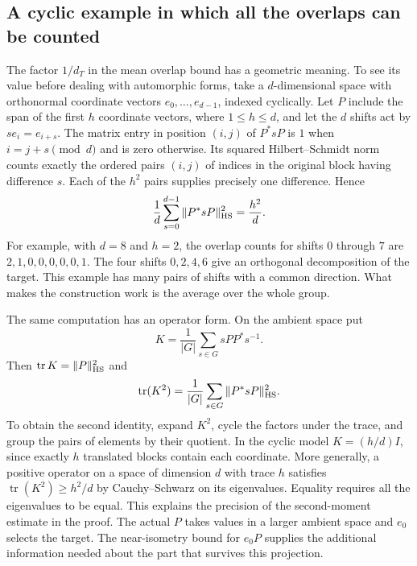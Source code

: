 \documentclass[11pt,letterpaper]{article}
\begin{document}
\subsection{A cyclic example in which all the overlaps can be counted}
\label{sec:cyclic-frame}
The factor $1/d_T$ in the mean overlap bound has a geometric meaning. To see its value before dealing with automorphic forms, take a $d$-dimensional space with orthonormal coordinate vectors $e_0,\ldots,e_{d-1}$, indexed cyclically. Let $P$ include the span of the first $h$ coordinate vectors, where $1\le h\le d$, and let the $d$ shifts act by $s e_i=e_{i+s}$. The matrix entry in position $(i,j)$ of $P^*sP$ is $1$ when $i=j+s\pmod d$ and is zero otherwise. Its squared Hilbert--Schmidt norm counts exactly the ordered pairs $(i,j)$ of indices in the original block having difference $s$. Each of the $h^2$ pairs supplies precisely one difference. Hence
\[
   \frac1d\sum_{s=0}^{d-1}\|P^*sP\|_{\rm HS}^2=\frac{h^2}{d}.
\]
For example, with $d=8$ and $h=2$, the overlap counts for shifts $0$ through $7$ are $2,1,0,0,0,0,0,1$. The four shifts $0,2,4,6$ give an orthogonal decomposition of the target. This example has many pairs of shifts with a common direction. What makes the construction work is the average over the whole group.

The same computation has an operator form. On the ambient space put
\[
       K=\frac1{|G|}\sum_{s\in G}sPP^*s^{-1}.
\]
Then $\operatorname{tr}K=\|P\|_{\rm HS}^2$ and
\[
        \operatorname{tr}(K^2)=\frac1{|G|}
                       \sum_{s\in G}\|P^*sP\|_{\rm HS}^2.
\]
To obtain the second identity, expand $K^2$, cycle the factors under the trace, and group the pairs of elements by their quotient. In the cyclic model $K=(h/d)I$, since exactly $h$ translated blocks contain each coordinate. More generally, a positive operator on a space of dimension $d$ with trace $h$ satisfies $\operatorname{tr}(K^2)\ge h^2/d$ by Cauchy--Schwarz on its eigenvalues. Equality requires all the eigenvalues to be equal. This explains the precision of the second-moment estimate in the proof. The actual $P$ takes values in a larger ambient space and $e_0$ selects the target. The near-isometry bound for $e_0P$ supplies the additional information needed about the part that survives this projection.
\end{document}

